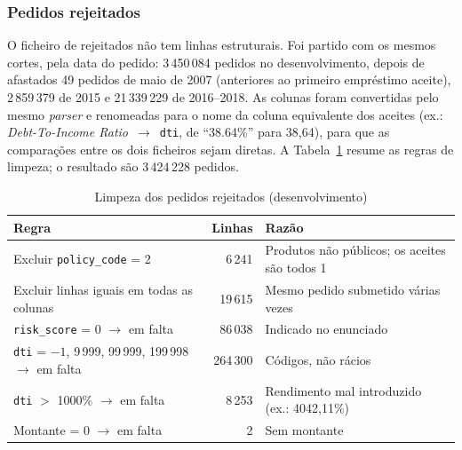 \subsubsection{Pedidos rejeitados}

O ficheiro de rejeitados não tem linhas estruturais. Foi partido com os mesmos cortes, pela
data do pedido: 3\,450\,084 pedidos no desenvolvimento, depois de afastados 49 pedidos de
maio de 2007 (anteriores ao primeiro empréstimo aceite), 2\,859\,379 de 2015 e
21\,339\,229 de 2016--2018. As colunas foram convertidas pelo mesmo \textit{parser} e
renomeadas para o nome da coluna equivalente dos aceites (ex.: \textit{Debt-To-Income
Ratio}~$\rightarrow$~\texttt{dti}, de ``38.64\%'' para 38,64), para que as comparações entre
os dois ficheiros sejam diretas. A Tabela~\ref{tab:rejeitados} resume as regras de
limpeza; o resultado são 3\,424\,228 pedidos.

\begin{table}[!t]
\caption{Limpeza dos pedidos rejeitados (desenvolvimento)}
\label{tab:rejeitados}
\centering
\footnotesize
\begin{tabular}{|p{}|r|p{}|}
\hline
\textbf{Regra} & \textbf{Linhas} & \textbf{Razão} \\
\hline
Excluir \texttt{policy\_code} = 2 & 6\,241 & Produtos não públicos; os aceites são todos 1 \\
\hline
Excluir linhas iguais em todas as colunas & 19\,615 & Mesmo pedido submetido várias vezes \\
\hline
\texttt{risk\_score} = 0 $\rightarrow$ em falta & 86\,038 & Indicado no enunciado \\
\hline
\texttt{dti} = $-1$, 9\,999, 99\,999, 199\,998 $\rightarrow$ em falta & 264\,300 & Códigos, não rácios \\
\hline
\texttt{dti} $>$ 1000\% $\rightarrow$ em falta & 8\,253 & Rendimento mal introduzido (ex.: 4042,11\%) \\
\hline
Montante = 0 $\rightarrow$ em falta & 2 & Sem montante \\
\hline
\end{tabular}
\end{table}

